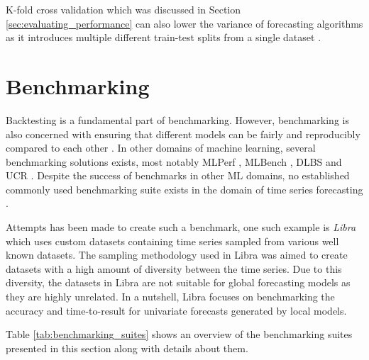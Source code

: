 K-fold cross validation which was discussed in Section \ref{sec:evaluating_performance} can also lower the variance of forecasting algorithms as it introduces multiple different train-test splits from a single dataset \cite{buhlmann2002analyzing}.

\section{Benchmarking}
\label{sec:related_work}

Backtesting is a fundamental part of benchmarking. However, benchmarking is also concerned with ensuring that different models can be fairly and reproducibly compared to each other \cite{huang_benchmarking_2019}. In other domains of machine learning, several benchmarking solutions exists, most notably MLPerf \cite{mattson_mlperf_2020}, MLBench \cite{noauthor_mlbench_nodate}, DLBS \cite{vassilieva_deep_nodate} and UCR \cite{dau2019ucr}. Despite the success of benchmarks in other ML domains, no established commonly used benchmarking suite exists in the domain of time series forecasting \cite{huang_benchmarking_2019}.

Attempts has been made to create such a benchmark, one such example is \textit{Libra} \cite{bauer2021libra} which uses custom datasets containing time series sampled from various well known datasets. The sampling methodology used in Libra was aimed to create datasets with a high amount of diversity between the time series. Due to this diversity, the datasets in Libra are not suitable for global forecasting models as they are highly unrelated. In a nutshell, Libra focuses on benchmarking the accuracy and time-to-result for univariate forecasts generated by local models.

Table \ref{tab:benchmarking_suites} shows an overview of the benchmarking suites presented in this section along with details about them.

